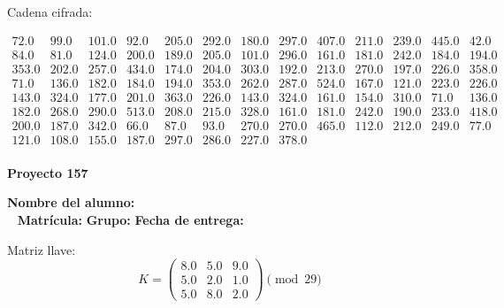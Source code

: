 \documentclass[12pt]{article}
\begin{document}
Cadena cifrada:
\begin{center}
$\begin{array}{lllllllllllll}
72.0 & 99.0 & 101.0 & 92.0 & 205.0 & 292.0 & 180.0 & 297.0 & 407.0 & 211.0 & 239.0 & 445.0 & 42.0\\
84.0 & 81.0 & 124.0 & 200.0 & 189.0 & 205.0 & 101.0 & 296.0 & 161.0 & 181.0 & 242.0 & 184.0 & 194.0\\
353.0 & 202.0 & 257.0 & 434.0 & 174.0 & 204.0 & 303.0 & 192.0 & 213.0 & 270.0 & 197.0 & 226.0 & 358.0\\
71.0 & 136.0 & 182.0 & 184.0 & 194.0 & 353.0 & 262.0 & 287.0 & 524.0 & 167.0 & 121.0 & 223.0 & 226.0\\
143.0 & 324.0 & 177.0 & 201.0 & 363.0 & 226.0 & 143.0 & 324.0 & 161.0 & 154.0 & 310.0 & 71.0 & 136.0\\
182.0 & 268.0 & 290.0 & 513.0 & 208.0 & 215.0 & 328.0 & 161.0 & 181.0 & 242.0 & 190.0 & 233.0 & 418.0\\
200.0 & 187.0 & 342.0 & 66.0 & 87.0 & 93.0 & 270.0 & 270.0 & 465.0 & 112.0 & 212.0 & 249.0 & 77.0\\
121.0 & 108.0 & 155.0 & 187.0 & 297.0 & 286.0 & 227.0 & 378.0\\
\end{array}$
\end{center}

\newpage


\textbf{Proyecto 157}

\textbf{Nombre del alumno:} \underline{\hspace{13cm}}\\\
\vspace{1cm}
\textbf{Matrícula:} \underline{\hspace{4cm}} \hspace{1cm}
\textbf{Grupo:} \underline{\hspace{2cm}}
\textbf{Fecha de entrega:} \underline{\hspace{2cm}}

\medskip

Matriz llave:
\[
K = \begin{pmatrix}
8.0 & 5.0 & 9.0\\
5.0 & 2.0 & 1.0\\
5.0 & 8.0 & 2.0
\end{pmatrix} \pmod{29}
\]
\end{document}
